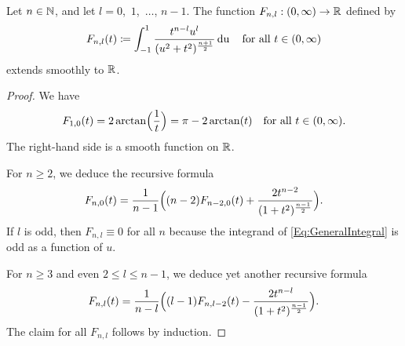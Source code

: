 \documentclass[\MainFolder/Text.tex]{subfiles}
\begin{document}
%
%
\begin{Lem} \label{Lem:GeneralIntegralExtension}
Let $n\in \mathbb{N}$, and let $l=0$,~$1$,~$\dotsc$, $n-1$. The function $F_{n,l}: (0,\infty)\rightarrow \mathbb{R}$ defined by
\begin{equation}\label{Eq:GeneralIntegral}
F_{n,l}(t) \coloneqq \int_{-1}^1 \frac{t^{n-l} u^l}{(u^2+t^2)^{\frac{n+1}{2}}} \operatorname{du}\quad\text{for all }t\in(0,\infty)
\end{equation}
extends smoothly to $\mathbb{R}$.
\end{Lem} 
\begin{proof}
We have
$$ F_{1,0}(t) = 2 \arctan\Bigl(\frac{1}{t}\Bigr)=\pi - 2 \arctan(t) \quad\text{for all }t\in (0,\infty). $$
The right-hand side is a smooth function on $\mathbb{R}$.

For $n\ge 2$, we deduce the recursive formula
$$ F_{n,0}(t) = \frac{1}{n-1}\Bigl((n-2)F_{n-2,0}(t)+\frac{2 t^{n-2}}{(1+t^2)^{\frac{n-1}{2}}}\Bigr).$$
If $l$ is odd, then $F_{n,l}\equiv 0$ for all $n$ because the integrand of \eqref{Eq:GeneralIntegral} is odd as a function of $u$.

For $n\ge 3$ and even $2\le l \le n-1$, we deduce yet another recursive formula
$$  F_{n,l}(t) = \frac{1}{n-l}\Bigl((l-1) F_{n,l-2}(t) -  \frac{2 t^{n-l}}{(1+t^2)^{\frac{n-1}{2}}} \Bigr).
$$
The claim for all $F_{n,l}$ follows by induction.
\end{proof}
\end{document}
